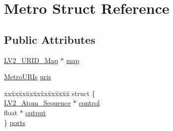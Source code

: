 \hypertarget{struct_metro}{}\section{Metro Struct Reference}
\label{struct_metro}
\subsection*{Public Attributes}
\begin{DoxyCompactItemize}
\item 
\hyperlink{urid_8h_afefb42cd271f750506a8739f73c098c5}{L\+V2\+\_\+\+U\+R\+I\+D\+\_\+\+Map} $\ast$ \hyperlink{struct_metro_a9634657834ec815571a001ec39d199ea}{map}
\item 
\hyperlink{struct_metro_u_r_is}{Metro\+U\+R\+Is} \hyperlink{struct_metro_ad4d1aee5161d6e66279edc5b05012087}{uris}
\item 
\begin{tabbing}
xx\=xx\=xx\=xx\=xx\=xx\=xx\=xx\=xx\=\kill
struct \{\\
\>\hyperlink{struct_l_v2___atom___sequence}{LV2\_Atom\_Sequence} $\ast$ \hyperlink{struct_metro_ab81ffab3af21d9bc735c99a362ae3766}{control}\\
\>float $\ast$ \hyperlink{struct_metro_aa7a60a05020740815537be1a2684788f}{output}\\
\} \hyperlink{struct_metro_aee87e33543837a45e1125cf3ed2cbc9c}{ports}\\


\end{tabbing}
\end{DoxyCompactItemize}
